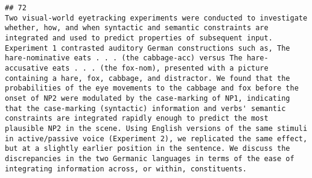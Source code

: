 \documentclass[
  english,
  man]{apa6}
\begin{document}
\begin{verbatim}
## 72                                                                                                                                                                                                                                                                                                                                                                                                                                                                                                                                                                                                                                                                                                                                                                                                                                                                                                                                                                                                                                                                                                                                                                                                                                                                                                                                                                                                                                                                                                                                                                                Two visual-world eyetracking experiments were conducted to investigate whether, how, and when syntactic and semantic constraints are integrated and used to predict properties of subsequent input. Experiment 1 contrasted auditory German constructions such as, The hare-nominative eats . . . (the cabbage-acc) versus The hare-accusative eats . . . (the fox-nom), presented with a picture containing a hare, fox, cabbage, and distractor. We found that the probabilities of the eye movements to the cabbage and fox before the onset of NP2 were modulated by the case-marking of NP1, indicating that the case-marking (syntactic) information and verbs' semantic constraints are integrated rapidly enough to predict the most plausible NP2 in the scene. Using English versions of the same stimuli in active/passive voice (Experiment 2), we replicated the same effect, but at a slightly earlier position in the sentence. We discuss the discrepancies in the two Germanic languages in terms of the ease of integrating information across, or within, constituents.

\end{verbatim}
\end{document}
